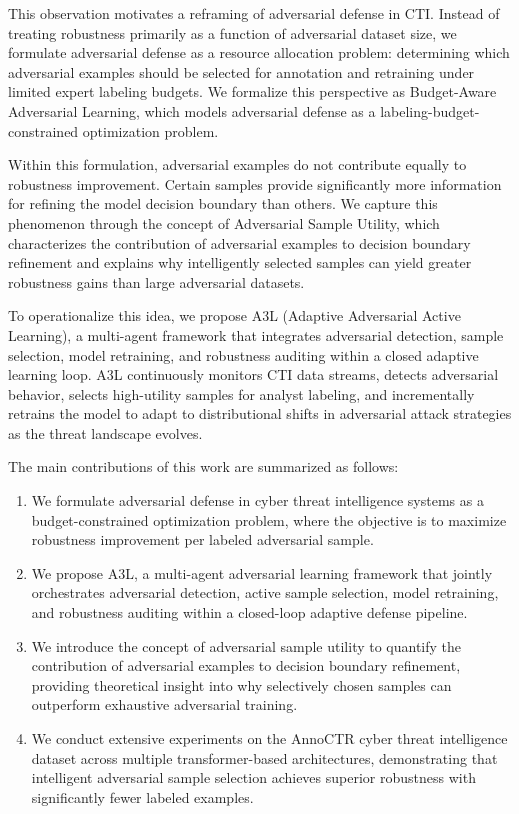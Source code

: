 \documentclass[review,1p,times,number]{elsarticle}
\begin{document}
This observation motivates a reframing of adversarial defense in CTI.
Instead of treating robustness primarily as a function of adversarial
dataset size, we formulate adversarial defense as a resource allocation
problem: determining which adversarial examples should be selected for
annotation and retraining under limited expert labeling budgets. We
formalize this perspective as Budget-Aware Adversarial Learning,
which models adversarial defense as a labeling-budget-constrained
optimization problem.

Within this formulation, adversarial examples do not contribute equally to
robustness improvement. Certain samples provide significantly more
information for refining the model decision boundary than others. We
capture this phenomenon through the concept of Adversarial Sample
Utility, which characterizes the contribution of adversarial examples to
decision boundary refinement and explains why intelligently selected
samples can yield greater robustness gains than large adversarial datasets.

To operationalize this idea, we propose A3L (Adaptive Adversarial
Active Learning), a multi-agent framework that integrates adversarial
detection, sample selection, model retraining, and robustness auditing
within a closed adaptive learning loop. A3L continuously monitors CTI data
streams, detects adversarial behavior, selects high-utility samples for
analyst labeling, and incrementally retrains the model to adapt to
distributional shifts in adversarial attack strategies as the threat
landscape evolves.

The main contributions of this work are summarized as follows:

\begin{enumerate}[leftmargin=1.5em,itemsep=2pt]

\item We formulate adversarial defense in cyber threat intelligence systems as
a budget-constrained optimization problem, where the objective is to
maximize robustness improvement per labeled adversarial sample.

\item We propose A3L, a multi-agent adversarial learning framework that
jointly orchestrates adversarial detection, active sample selection,
model retraining, and robustness auditing within a closed-loop adaptive
defense pipeline.

\item We introduce the concept of adversarial sample utility to quantify the
contribution of adversarial examples to decision boundary refinement,
providing theoretical insight into why selectively chosen samples can
outperform exhaustive adversarial training.

\item We conduct extensive experiments on the AnnoCTR cyber threat intelligence
dataset across multiple transformer-based architectures, demonstrating
that intelligent adversarial sample selection achieves superior robustness
with significantly fewer labeled examples.

\end{enumerate}
\end{document}
